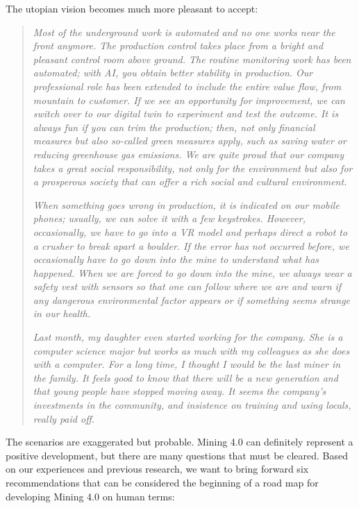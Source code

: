 \documentclass[
  12pt,
]{scrbook}
\begin{document}
The utopian vision becomes much more pleasant to accept:

\begin{quote}
\emph{Most of the underground work is automated and no one works near the front anymore. The production control takes place from a bright and pleasant control room above ground. The routine monitoring work has been automated; with AI, you obtain better stability in production. Our professional role has been extended to include the entire value flow, from mountain to customer. If we see an opportunity for improvement, we can switch over to our digital twin to experiment and test the outcome. It is always fun if you can trim the production; then, not only financial measures but also so-called green measures apply, such as saving water or reducing greenhouse gas emissions. We are quite proud that our company takes a great social responsibility, not only for the environment but also for a prosperous society that can offer a rich social and cultural environment.}

\emph{When something goes wrong in production, it is indicated on our mobile phones; usually, we can solve it with a few keystrokes. However, occasionally, we have to go into a VR model and perhaps direct a robot to a crusher to break apart a boulder. If the error has not occurred before, we occasionally have to go down into the mine to understand what has happened. When we are forced to go down into the mine, we always wear a safety vest with sensors so that one can follow where we are and warn if any dangerous environmental factor appears or if something seems strange in our health.}

\emph{Last month, my daughter even started working for the company. She is a computer science major but works as much with my colleagues as she does with a computer. For a long time, I thought I would be the last miner in the family. It feels good to know that there will be a new generation and that young people have stopped moving away. It seems the company's investments in the community, and insistence on training and using locals, really paid off.}
\end{quote}

The scenarios are exaggerated but probable. Mining 4.0 can definitely represent a positive development, but there are many questions that must be cleared. Based on our experiences and previous research, we want to bring forward six recommendations that can be considered the beginning of a road map for developing Mining 4.0 on human terms:
\end{document}
